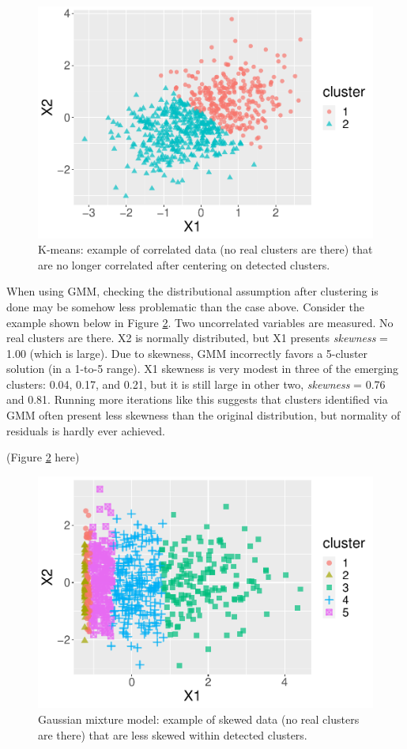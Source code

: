 \documentclass[
  man,floatsintext]{apa6}
\begin{document}
\begin{figure}

{\centering \includegraphics[width=0.7\linewidth]{paper_files/figure-latex/figure-kmeans-assumptions-1} 

}

\caption{K-means: example of correlated data (no real clusters are there) that are no longer correlated after centering on detected clusters.}\label{fig:figure-kmeans-assumptions}
\end{figure}

When using GMM, checking the distributional assumption after clustering is done may be somehow less problematic than the case above. Consider the example shown below in Figure \ref{fig:figure-gmm-assumptions}. Two uncorrelated variables are measured. No real clusters are there. X2 is normally distributed, but X1 presents \emph{skewness} = 1.00 (which is large). Due to skewness, GMM incorrectly favors a 5-cluster solution (in a 1-to-5 range). X1 skewness is very modest in three of the emerging clusters: 0.04, 0.17, and 0.21, but it is still large in other two, \emph{skewness} = 0.76 and 0.81. Running more iterations like this suggests that clusters identified via GMM often present less skewness than the original distribution, but normality of residuals is hardly ever achieved.

(Figure \ref{fig:figure-gmm-assumptions} here)

\begin{figure}

{\centering \includegraphics[width=0.7\linewidth]{paper_files/figure-latex/figure-gmm-assumptions-1} 

}

\caption{Gaussian mixture model: example of skewed data (no real clusters are there) that are less skewed within detected clusters.}\label{fig:figure-gmm-assumptions}
\end{figure}
\end{document}
